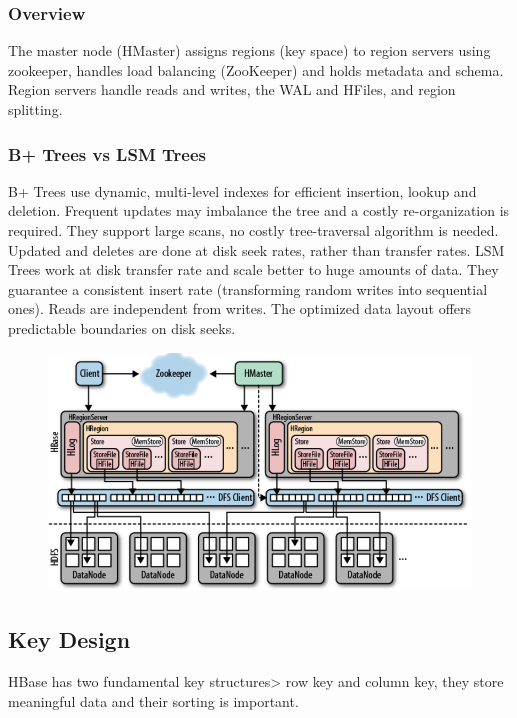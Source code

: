 		\subsubsection{Overview}
		The master node (HMaster) assigns regions (key space) to region servers using zookeeper, handles load balancing (ZooKeeper) and holds metadata and schema.\newline
		Region servers handle reads and writes, the WAL and HFiles, and region splitting.
		\subsubsection{B+ Trees vs LSM Trees}
		B+ Trees use dynamic, multi-level indexes for efficient insertion, lookup and deletion. Frequent updates may imbalance the tree and a costly re-organization is required.\newline
		They support large scans, no costly tree-traversal algorithm is needed.\newline
		Updated and deletes are done at disk seek rates, rather than transfer rates.\newline
		\newline
		LSM Trees work at disk transfer rate and scale better to huge amounts of data. They guarantee a consistent insert rate (transforming random writes into sequential ones).\newline
		Reads are independent from writes. The optimized data layout offers predictable boundaries on disk seeks.
		\begin{figure}[H]
			\centering
			\includegraphics[width=0.7\linewidth]{images/hbasestorage.png}
		\end{figure}
	\subsection{Key Design}
		HBase has two fundamental key structures> row key and column key, they store meaningful data and their sorting is important.

